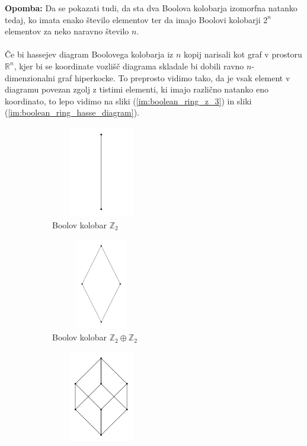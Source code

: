 \documentclass[a4paper]{article}
\newcounter{environment:definition_counter}
\newcounter{environment:theorem_counter}
\newcounter{environment:statement_counter}
\newenvironment{remark}
{\textbf{Opomba: }}
{}
\begin{document}
\begin{remark}
Da se pokazati tudi, da sta dva Boolova kolobarja izomorfna natanko tedaj, ko imata enako število elementov ter da imajo Boolovi kolobarji $2^n$ elementov za neko naravno število $n$.
\end{remark}
\\
\\
Če bi hassejev diagram Boolovega kolobarja iz $n$ kopij narisali kot graf v prostoru $\mathbb{R}^n$, kjer bi se koordinate vozlišč diagrama skladale bi dobili ravno $n$-dimenzionalni graf hiperkocke. To preprosto vidimo tako, da je vsak element v diagramu povezan zgolj z tistimi elementi, ki imajo različno natanko eno koordinato, to lepo vidimo na sliki (\ref{im:boolean_ring_z_3}) in sliki (\ref{im:boolean_ring_hasse_diagram}).
\begin{figure}[h]
\begin{subfigure}[b]{0.5\textwidth}
\centering
\includegraphics[width=0.48\textwidth, height=4cm]{bool1}
\caption{Boolov kolobar $\mathbb{Z}_2$}
\end{subfigure}
\hfill
\begin{subfigure}[b]{0.5\textwidth}
\centering
\includegraphics[width=0.48\textwidth, height=4cm]{bool2}
\caption{Boolov kolobar $\mathbb{Z}_2 \oplus \mathbb{Z}_2$}
\end{subfigure}
\begin{subfigure}[b]{0.5\textwidth}
\centering
\includegraphics[width=0.48\textwidth, height=4cm]{bool3}

\end{subfigure}
\end{figure}
\end{document}
